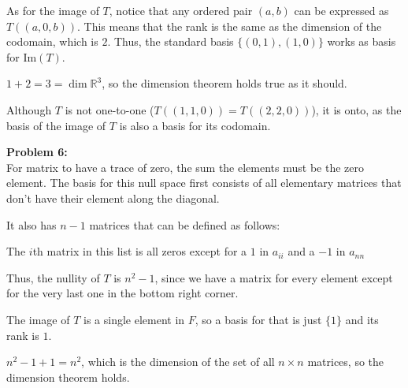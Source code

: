 \documentclass[12pt]{article}
\begin{document}
\begin{enumerate}
            As for the image of $T$, notice that any ordered pair $(a,b)$ can be expressed as $T((a,0,b))$.
            This means that the rank is the same as the dimension of the codomain, which is $2$.
            Thus, the standard basis $\{(0, 1), (1, 0)\}$ works as basis for $\text{Im}(T)$.

            $1+2=3=\dim \mathbb{R}^3$, so the dimension theorem holds true as it should.

            Although $T$ is not one-to-one ($T((1,1,0))=T((2,2,0))$), it is onto,
            as the basis of the image of $T$ is also a basis for its codomain.

            \textbf{Problem 6:} \\
            For matrix to have a trace of zero, the sum the elements must be the zero element.
            The basis for this null space first consists of all elementary matrices that don't have their element along the diagonal.

            It also has $n-1$ matrices that can be defined as follows:
            \begin{center}
                  The $i$th matrix in this list is all zeros except for a $1$ in $a_{ii}$ and a $-1$ in $a_{nn}$
            \end{center}
            Thus, the nullity of $T$ is $n^2-1$, since we have a matrix for every element except for the very last one in the bottom right corner.

            The image of $T$ is a single element in $F$, so a basis for that is just $\{1\}$ and its rank is $1$.

            $n^2-1+1=n^2$, which is the dimension of the set of all $n \times n$ matrices, so the dimension theorem holds.


\end{enumerate}
\end{document}
